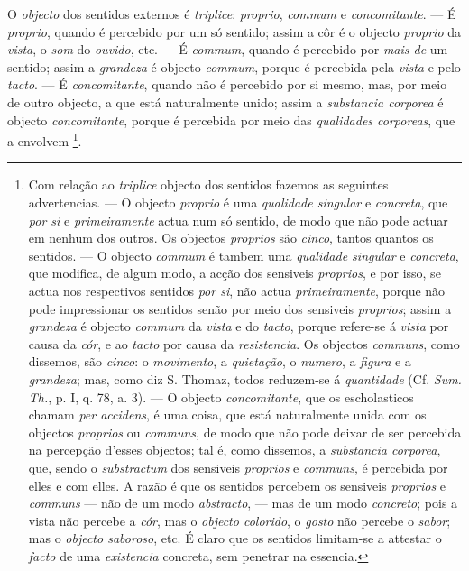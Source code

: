 
O \emph{objecto} dos sentidos externos é \emph{triplice}: \emph{proprio}, \emph{commum} e \emph{concomitante}. --- É \emph{proprio}, quando é percebido por um só sentido; assim a côr é o objecto \emph{proprio} da \emph{vista}, o \emph{som} do \emph{ouvido}, etc. --- É \emph{commum}, quando é percebido por \emph{mais de} um sentido; assim a \emph{grandeza} é objecto \emph{commum}, porque é percebida pela \emph{vista} e pelo \emph{tacto}. --- É \emph{concomitante}, quando não é percebido por si mesmo, mas, por meio de outro objecto, a que está naturalmente unido; assim   a \emph{substancia corporea} é objecto \emph{concomitante}, porque é percebida por meio das \emph{qualidades corporeas}, que a envolvem \footnote{Com relação ao \emph{triplice} objecto dos sentidos fazemos as seguintes advertencias. --- O objecto \emph{proprio} é uma \emph{qualidade singular} e \emph{concreta}, que \emph{por si} e \emph{primeiramente} actua num só sentido, de modo que não pode actuar em nenhum dos outros. Os objectos \emph{proprios} são \emph{cinco}, tantos quantos os sentidos. --- O objecto \emph{commum} é tambem uma \emph{qualidade singular} e \emph{concreta}, que modifica, de algum modo, a acção dos sensiveis \emph{proprios}, e por isso, se actua nos respectivos sentidos \emph{por si}, não actua \emph{primeiramente}, porque não pode impressionar os sentidos senão por meio dos sensiveis \emph{proprios}; assim a \emph{grandeza} é objecto \emph{commum} da \emph{vista} e do \emph{tacto}, porque refere-se á \emph{vista} por causa da \emph{cór}, e ao \emph{tacto} por causa da \emph{resistencia}. Os objectos \emph{communs}, como dissemos, são \emph{cinco}: o \emph{movimento}, a \emph{quietação}, o \emph{numero}, a \emph{figura} e a \emph{grandeza}; mas, como diz S. Thomaz, todos reduzem-se á \emph{quantidade} (Cf. \emph{Sum. Th.}, p. I, q. 78, a. 3). --- O objecto \emph{concomitante}, que os escholasticos chamam \emph{per accidens}, é uma coisa, que está naturalmente unida com os objectos \emph{proprios} ou \emph{communs}, de modo que não pode deixar de ser percebida na percepção d'esses objectos; tal é, como dissemos, a \emph{substancia corporea}, que, sendo o \emph{substractum} dos sensiveis \emph{proprios} e \emph{communs}, é percebida por elles e com elles. A razão é que os sentidos percebem os sensiveis \emph{proprios} e \emph{communs} --- não de um modo \emph{abstracto}, --- mas de um modo \emph{concreto}; pois a vista não percebe a \emph{cór}, mas o \emph{objecto colorido}, o \emph{gosto} não percebe o \emph{sabor}; mas o \emph{objecto saboroso}, etc. É claro que os sentidos limitam-se a attestar o \emph{facto} de uma \emph{existencia} concreta, sem penetrar na essencia.}.

